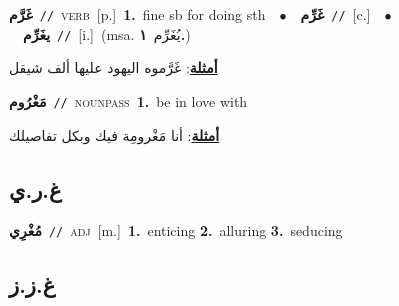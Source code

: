 \documentclass[10pt,a4paper,twoside]{article} %
\begin{document}
\begin{multicols}{2}
{\setlength\topsep{0pt}\textbf{\foreignlanguage{arabic}{غَرَّم}}\ {\color{gray}\texttt{//}\color{black}}\ \textsc{verb}\ [p.]\ \textbf{1.}~fine sb for doing sth\ \ $\bullet$\ \ \setlength\topsep{0pt}\textbf{\foreignlanguage{arabic}{غَرِّم}}\ {\color{gray}\texttt{//}\color{black}}\ [c.]\ \ $\bullet$\ \ \setlength\topsep{0pt}\textbf{\foreignlanguage{arabic}{يغَرِّم}}\ {\color{gray}\texttt{//}\color{black}}\ [i.]\ \color{gray}(msa. \foreignlanguage{arabic}{يُغَرِّم}~\foreignlanguage{arabic}{\textbf{١.}})\color{black}\  \begin{flushright}\color{gray}\foreignlanguage{arabic}{\textbf{\underline{\foreignlanguage{arabic}{أمثلة}}}: غَرَّموه اليهود عليها ألف شيقل}\end{flushright}\color{black}} \vspace{2mm}

{\setlength\topsep{0pt}\textbf{\foreignlanguage{arabic}{مَغْرُوم}}\ {\color{gray}\texttt{//}\color{black}}\ \textsc{noun\textunderscore pass}\ \textbf{1.}~be in love with\  \begin{flushright}\color{gray}\foreignlanguage{arabic}{\textbf{\underline{\foreignlanguage{arabic}{أمثلة}}}: أنا مَغْرومِة فيك وبكل تفاصيلك}\end{flushright}\color{black}} \vspace{2mm}

\vspace{-3mm}
\subsection*{\color{blue}\foreignlanguage{arabic}{غ.ر.ي}\color{blue}{}} 

{\setlength\topsep{0pt}\textbf{\foreignlanguage{arabic}{مُغْرِي}}\ {\color{gray}\texttt{//}\color{black}}\ \textsc{adj}\ [m.]\ \textbf{1.}~enticing  \textbf{2.}~alluring  \textbf{3.}~seducing\ } \vspace{2mm}

\vspace{-3mm}
\subsection*{\color{blue}\foreignlanguage{arabic}{غ.ز.ز}\color{blue}{}} 


\end{multicols}
\end{document}
